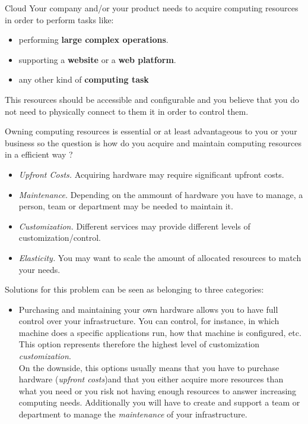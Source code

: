\begin{pattern}{Cloud}  \label{chap:patterns:pattern:cloud}
    \context
    Your company and/or your product needs to acquire computing resources in order to perform tasks like:
    \begin{itemize}
        \item performing \textbf{large complex operations}.
        \item supporting a \textbf{website} or a \textbf{web platform}.
        \item any other kind of \textbf{computing task}
    \end{itemize}
    This resources should be accessible and configurable and you believe that you do not need to physically connect to them it in order to control them.

    \problem
    Owning computing resources is essential or at least advantageous to you or your business so the question is how do you acquire and maintain computing resources in a efficient way ?

    \forces
        \begin{itemize}
            \item \textit{Upfront Costs.} Acquiring hardware may require significant upfront costs.
            \item \textit{Maintenance.}  Depending on the ammount of hardware you have to manage, a person, team or department may be needed to maintain it.
            \item \textit{Customization.} Different services may provide different levels of customization/control.
            \item \textit{Elasticity.} You may want to scale the amount of allocated resources to match your needs.
        \end{itemize}

    \solution
        Solutions for this problem can be seen as belonging to three categories:
        \begin{itemize}
            \item Purchasing and maintaining your own hardware allows you to have full control over your infrastructure. You can control, for instance, in which machine does a specific applications run, how that machine is configured, etc. This option represents therefore the highest level of customization \textit{customization}. \\
            On the downside, this options usually means that you have to purchase hardware (\textit{upfront costs})and that you either acquire more resources than what you need or you risk not having enough resources to answer increasing computing needs. Additionally you will have to create and support a team or department to manage the \textit{maintenance} of your infrastructure. \\


\end{itemize}
\end{pattern}
